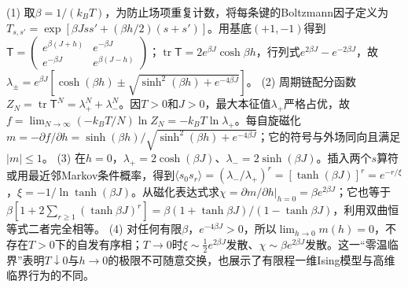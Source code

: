 (1) 取\(\beta=1/(k_BT)\)，为防止场项重复计数，将每条键的Boltzmann因子定义为\(T_{s,s'}=\exp[\beta Jss'+(\beta h/2)(s+s')]\)。用基底\((+1,-1)\)得到\(\mathsf T=\begin{pmatrix}e^{\beta(J+h)}&e^{-\beta J}\\e^{-\beta J}&e^{\beta(J-h)}\end{pmatrix}\)；\(\operatorname{tr}\mathsf T=2e^{\beta J}\cosh\beta h\)，行列式\(e^{2\beta J}-e^{-2\beta J}\)，故\(\lambda_\pm=e^{\beta J}[\cosh(\beta h)\pm\sqrt{\sinh^2(\beta h)+e^{-4\beta J}}]\)。
(2) 周期链配分函数\(Z_N=\operatorname{tr}\mathsf T^N=\lambda_+^N+\lambda_-^N\)。因\(T>0\)和\(J>0\)，最大本征值\(\lambda_+\)严格占优，故\(f=\lim_{N\to\infty}(-k_BT/N)\ln Z_N=-k_BT\ln\lambda_+\)。每自旋磁化\(m=-\partial f/\partial h=\sinh(\beta h)/\sqrt{\sinh^2(\beta h)+e^{-4\beta J}}\)；它的符号与外场同向且满足\(|m|\le1\)。
(3) 在\(h=0\)，\(\lambda_+=2\cosh(\beta J)\)、\(\lambda_-=2\sinh(\beta J)\)。插入两个\(s\)算符或用最近邻Markov条件概率，得到\(\langle s_0s_r\rangle=(\lambda_-/\lambda_+)^r=[\tanh(\beta J)]^r=e^{-r/\xi}\)，\(\xi=-1/\ln\tanh(\beta J)\)。从磁化表达式求\(\chi=\partial m/\partial h|_{h=0}=\beta e^{2\beta J}\)；它也等于\(\beta[1+2\sum_{r\ge1}(\tanh\beta J)^r]=\beta(1+\tanh\beta J)/(1-\tanh\beta J)\)，利用双曲恒等式二者完全相等。
(4) 对任何有限\(\beta\)，\(e^{-4\beta J}>0\)，所以\(\lim_{h\to0}m(h)=0\)，不存在\(T>0\)下的自发有序相；\(T\to0\)时\(\xi\sim\tfrac12e^{2\beta J}\)发散、\(\chi\sim\beta e^{2\beta J}\)发散。这一“零温临界”表明\(T\downarrow0\)与\(h\to0\)的极限不可随意交换，也展示了有限程一维Ising模型与高维临界行为的不同。
